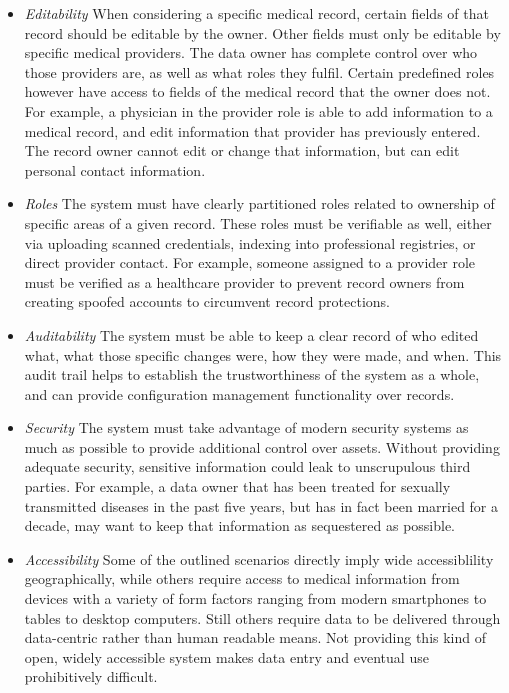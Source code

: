 \documentclass[10pt, conference, compsocconf]{IEEEtran}
\begin{document}
\begin{itemize}

\item \textit{Editability} When considering a specific medical record, certain fields of that record should be editable by the owner.  Other fields must only be editable by specific medical providers.  The data owner has complete control over who those providers are, as well as what roles they fulfil.  Certain predefined roles however have access to fields of the medical record that the owner does not.  For example, a physician in the provider role is able to add information to a medical record, and edit information that provider has previously entered.  The record owner cannot edit or change that information, but can edit personal contact information.

\item \textit{Roles} The system must have clearly partitioned roles related to ownership of specific areas of a given record.  These roles must be verifiable as well, either via uploading scanned credentials, indexing into professional registries, or direct provider contact.  For example, someone assigned to a provider role must be verified as a healthcare provider to prevent record owners from creating spoofed accounts to circumvent record protections.

\item \textit{Auditability} The system must be able to keep a clear record of who edited what, what those specific changes were, how they were made, and when.  This audit trail helps to establish the trustworthiness of the system as a whole, and can provide configuration management functionality over records.

\item \textit{Security} The system must take advantage of modern security systems as much as possible to provide additional control over assets.  Without providing adequate security, sensitive information could leak to unscrupulous third parties.  For example, a data owner that has been treated for sexually transmitted diseases in the past five years, but has in fact been married for a decade, may want to keep that information as sequestered as possible.

\item \textit{Accessibility} Some of the outlined scenarios directly imply wide accessiblility geographically, while others require access to medical information from devices with a variety of form factors ranging from modern smartphones to tables to desktop computers.  Still others require data to be delivered through data-centric rather than human readable means.  Not providing this kind of open, widely accessible system makes data entry and eventual use prohibitively difficult.


\end{itemize}
\end{document}
